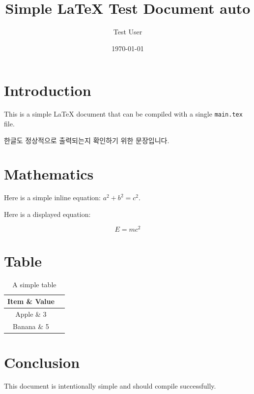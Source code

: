 \documentclass{article}
\title{Simple LaTeX Test Document auto}
\author{Test User}
\date{\today}
\begin{document}
\maketitle

\section{Introduction}

This is a simple LaTeX document that can be compiled with a single
\texttt{main.tex} file.

한글도 정상적으로 출력되는지 확인하기 위한 문장입니다.



\section{Mathematics}

Here is a simple inline equation: $a^2 + b^2 = c^2$.

Here is a displayed equation:

\[
    E = mc^2
\]

\section{Table}

\begin{table}[h]
    \centering
    \begin{tabular}{|c|c|}
        \hline
        Item \& Value \\
        \hline
        Apple \& 3 \\
        Banana \& 5 \\
        \hline
    \end{tabular}
    \caption{A simple table}
\end{table}

\section{Conclusion}

This document is intentionally simple and should compile successfully.
\end{document}
